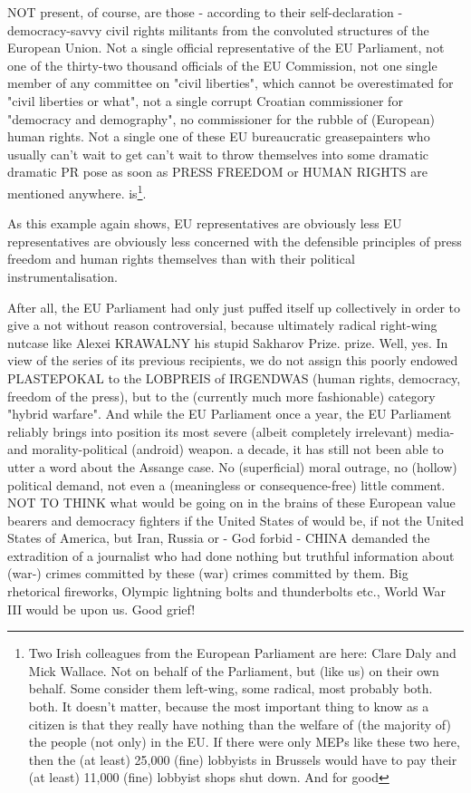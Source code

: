\begin{multicols}{2}
NOT present, of course, are those - according to their self-declaration - democracy-savvy civil rights militants
from the convoluted structures of the European Union. Not a single official representative of the EU Parliament,
not one of the thirty-two thousand officials of the
EU Commission, not one single member of any
committee on "civil liberties", which cannot be overestimated
for "civil liberties or what", not a single corrupt
Croatian commissioner for "democracy and demography", no commissioner for the rubble of (European) human rights. Not a single one of these EU bureaucratic greasepainters who usually can't wait to get
can't wait to throw themselves into some dramatic
dramatic PR pose as soon as PRESS FREEDOM or HUMAN RIGHTS are mentioned anywhere. 
is\footnote[10]{Two Irish colleagues from the European Parliament are here: Clare Daly and Mick Wallace. Not on behalf of the
Parliament, but (like us) on their own behalf. Some consider them left-wing, some radical, most probably both.
both. It doesn't matter, because the most important thing to know as a citizen is that they really have nothing
than the welfare of (the majority of) the people (not only) in the EU. If there were only MEPs like
these two here, then the (at least) 25,000 (fine) lobbyists in Brussels would have to pay their (at least)
11,000 (fine) lobbyist shops shut down. And for good}.

As this example again shows, EU representatives are obviously less
EU representatives are obviously less concerned with the defensible principles of press freedom and human rights themselves than with their political instrumentalisation.

After all, the EU Parliament had only just puffed itself up collectively in order to give a not without reason controversial, because ultimately radical right-wing nutcase like
Alexei KRAWALNY his stupid Sakharov Prize.
prize. Well, yes. In view of the series of its previous recipients, we do not assign this poorly endowed PLASTEPOKAL to the LOBPREIS of IRGENDWAS (human rights, democracy, freedom of the press), but to the
(currently much more fashionable) category "hybrid warfare". And while the EU Parliament once a
year, the EU Parliament reliably brings into position its most severe (albeit completely irrelevant) media- and morality-political (android) weapon.
a decade, it has still not been able to utter a word
about the Assange case. No (superficial) moral outrage, no (hollow) political demand,
not even a (meaningless or consequence-free)
little comment.
NOT TO THINK what would be going on in the brains of these European value bearers and democracy fighters if the United States of
would be, if not the United States of America,
but Iran, Russia or - God forbid - CHINA
demanded the extradition of a journalist who had done nothing
but truthful information about (war-) crimes committed by these
(war) crimes committed by them. Big rhetorical fireworks, Olympic lightning bolts and thunderbolts etc., World War III would be upon us. Good grief!


\end{multicols}
